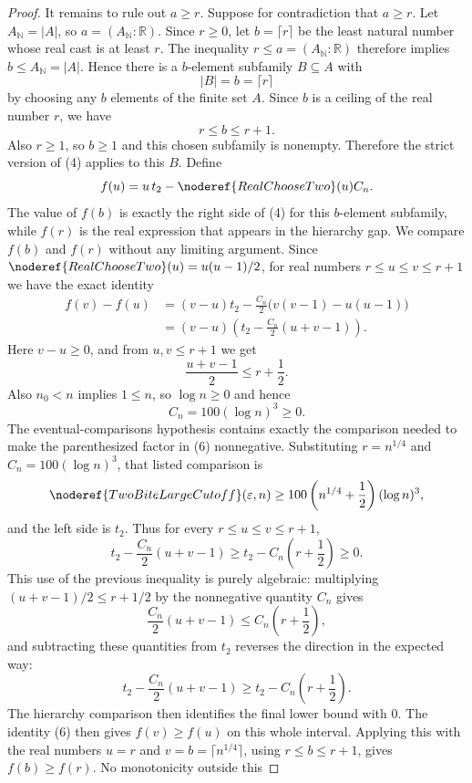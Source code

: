 \begin{proof}
It remains to rule out \(a\ge r\).  Suppose for contradiction that
\(a\ge r\).  Let \(A_{\mathbb N}=|A|\), so \(a=(A_{\mathbb N}:\mathbb R)\).
Since \(r\ge0\), let \(b=\lceil r\rceil\) be the least natural number whose
real cast is at least \(r\).  The inequality \(r\le a=(A_{\mathbb N}:\mathbb R)\)
therefore implies \(b\le A_{\mathbb N}=|A|\).  Hence there is a
\(b\)-element subfamily
\(B\subseteq A\) with
\[
|B|=b=\lceil r\rceil
\]
by choosing any \(b\) elements of the finite set \(A\).  Since \(b\) is a
ceiling of the real number \(r\), we have
\[
r\le b\le r+1.
\]
Also \(r\ge1\), so \(b\ge1\) and this chosen subfamily is nonempty.  Therefore
the strict version of (4) applies to this \(B\).  Define
\[
f(u)=u\,t_2-\noderef{RealChooseTwo}(u)C_n.
\]
The value of \(f(b)\) is exactly the right side of (4) for this
\(b\)-element subfamily, while \(f(r)\) is the real expression that appears in
the hierarchy gap.  We compare \(f(b)\) and \(f(r)\) without any limiting
argument.  Since
\(\noderef{RealChooseTwo}(u)=u(u-1)/2\), for real numbers
\(r\le u\le v\le r+1\) we have the exact identity
\[
\begin{aligned}
f(v)-f(u)
&=(v-u)t_2-\frac{C_n}{2}\bigl(v(v-1)-u(u-1)\bigr)\\
&=(v-u)\left(t_2-\frac{C_n}{2}(u+v-1)\right).
\end{aligned}
\tag{6}
\]
Here \(v-u\ge0\), and from \(u,v\le r+1\) we get
\[
\frac{u+v-1}{2}\le r+\frac12.
\]
Also \(n_0<n\) implies \(1\le n\), so \(\log n\ge0\) and hence
\[
C_n=100(\log n)^3\ge0.
\]
The eventual-comparisons hypothesis contains exactly the comparison needed to
make the parenthesized factor in (6) nonnegative.  Substituting
\(r=n^{1/4}\) and \(C_n=100(\log n)^3\), that listed comparison is
\[
\noderef{TwoBiteLargeCutoff}(\varepsilon,n)
\ge
100\left(n^{1/4}+\frac12\right)(\log n)^3,
\]
and the left side is \(t_2\).  Thus for every \(r\le u\le v\le r+1\),
\[
t_2-\frac{C_n}{2}(u+v-1)\ge
t_2-C_n\left(r+\frac12\right)\ge0.
\]
This use of the previous inequality is purely algebraic: multiplying
\((u+v-1)/2\le r+1/2\) by the nonnegative quantity \(C_n\) gives
\[
\frac{C_n}{2}(u+v-1)\le C_n\left(r+\frac12\right),
\]
and subtracting these quantities from \(t_2\) reverses the direction in the
expected way:
\[
t_2-\frac{C_n}{2}(u+v-1)
\ge t_2-C_n\left(r+\frac12\right).
\]
The hierarchy comparison then identifies the final lower bound with \(0\).
The identity (6) then gives \(f(v)\ge f(u)\) on this whole interval.  Applying
this with the real numbers \(u=r\) and \(v=b=\lceil n^{1/4}\rceil\), using
\(r\le b\le r+1\), gives \(f(b)\ge f(r)\).  No monotonicity outside this

\end{proof}
